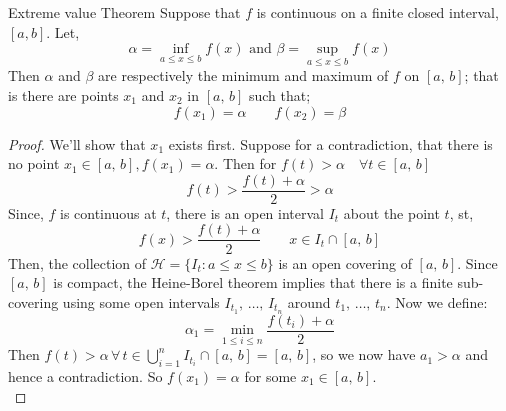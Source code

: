\documentclass{article}
\renewcommand{\a}{\alpha}
\renewcommand{\b}{\beta}
\begin{document}
{{{{\begin{theorem}{Extreme value Theorem}{}
  Suppose that $f$ is continuous on a finite closed interval, $[a, b]$. Let,
  $$ \a = \inf_{a\le x\le b}{f(x)}\text{ and } \b =\sup_{a\le x\le b}{f(x)} $$
  Then $\a$ and $\b$ are respectively the minimum and maximum of $f$ on $[a,\,b]$; that is there are points $x_1$ and $x_2$ in $[a,\,b]$ such that;
  $$ f(x_1) = \a \qquad f(x_2) = \b $$
\end{theorem}
\begin{proof}
  We'll show that $x_1$ exists first. Suppose for a contradiction, that there is no point $x_1 \in [a,\,b], f(x_1) = \a$. Then for $f(t) > \a\quad \forall t \in [a,\,b]$
  $$ f(t) > \frac{f(t) + \a}{2} > \a $$
  Since, $f$ is continuous at $t$, there is an open interval $I_t$ about the point $t$, st,
  $$ f(x) > \frac{f(t) + \a}{2} \qquad x\in I_t\cap[a,\, b] $$
  Then, the collection of $\displaystyle{\mathcal{H} = \{ I_t: a\le x \le b\}}$ is an open covering of $[a, \, b]$. Since $[a, \, b]$ is compact, the Heine-Borel theorem implies that there is a finite sub-covering using some open intervals $I_{t_1},\,\dots,\,I_{t_n}$ around $t_1,\,\dots,\,t_n$. Now we define:
  $$ \a_1 = \min_{1\le i \le n}{\frac{f(t_i) + \a}{2}} $$
  Then $f(t) > \a \,\forall \,t \in \bigcup_{i=1}^n{I_{t_i}\cap[a,\,b]} = [a,\,b]$, so we now have $a_1 >\a$ and hence a contradiction. So $f(x_1) = \a$ for some $x_1\in [a,\,b]$.\\


\end{proof}}}}}
\end{document}
